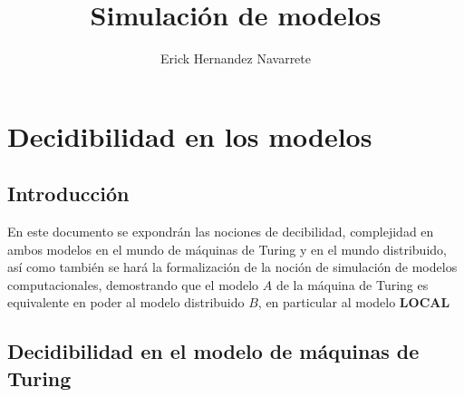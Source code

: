 \documentclass[10pt]{report}
\author{Erick Hernandez Navarrete}
\title{Simulación de modelos}
\begin{document}
    \maketitle
    \tableofcontents{}
    \chapter{Decidibilidad en los modelos}\label{ch:decidibilidad-en-los-modelos}
    \section{Introducción}\label{sec:introducción}
    En este documento se expondrán las nociones de decibilidad, complejidad en ambos modelos %
    en el mundo de máquinas de Turing y en el mundo distribuido,
    así como también se hará la formalización de la noción de simulación de modelos
    computacionales, demostrando que el modelo $A$ de  la máquina de
    Turing es equivalente en poder al modelo distribuido $B$, en particular al modelo \textbf{LOCAL}

    \section{Decidibilidad en el modelo de máquinas de Turing}\label{sec:decidibilidasd-en-el-modelo-de-máquinas-de-turing}
\end{document}
